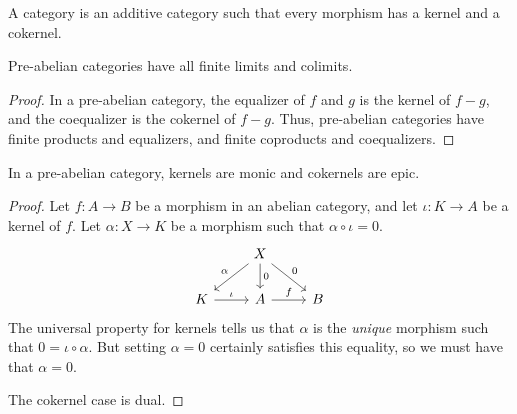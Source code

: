 \documentclass[main.tex]{subfiles}
\begin{document}
\begin{definition}
  \label{def:pre_abelian_category}
  A  category is an additive category such that every morphism has a kernel and a cokernel.
\end{definition}

\begin{lemma}
  \label{lemma:pre_abelian_categories_have_finite_limits_and_colimits}
  Pre-abelian categories have all finite limits and colimits.
\end{lemma}
\begin{proof}
  In a pre-abelian category, the equalizer of $f$ and $g$ is the kernel of $f-g$, and the coequalizer is the cokernel of $f-g$. Thus, pre-abelian categories have finite products and equalizers, and finite coproducts and coequalizers.
\end{proof}

\begin{proposition}
  In a pre-abelian category, kernels are monic and cokernels are epic.
\end{proposition}
\begin{proof}
  Let $f\colon A \to B$ be a morphism in an abelian category, and let $\iota\colon K \to A$ be a kernel of $f$. Let $\alpha\colon X \to K$ be a morphism such that $\alpha \circ \iota = 0$.
  \begin{equation*}
    \begin{tikzcd}
      & X
      \arrow[dl, swap, "\alpha"]
      \arrow[d, "0"]
      \arrow[dr, "0"]
      \\
      K
      \arrow[r, "\iota"]
      & A
      \arrow[r, "f"]
      & B
    \end{tikzcd}
  \end{equation*}
  The universal property for kernels tells us that $\alpha$ is the \emph{unique} morphism such that $0 = \iota \circ \alpha$. But setting $\alpha = 0$ certainly satisfies this equality, so we must have that $\alpha = 0$.

  The cokernel case is dual.
\end{proof}
\end{document}
